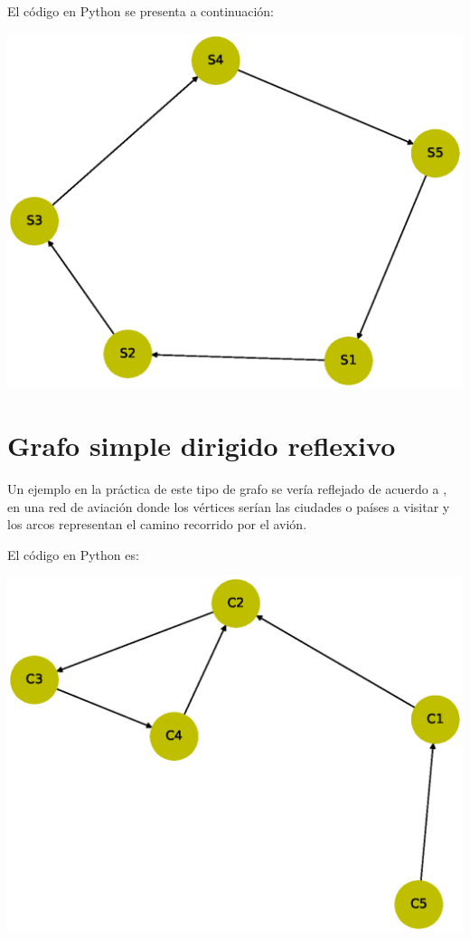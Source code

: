 \documentclass[10pt,a4paper]{article}
\begin{document}
El código en Python se presenta a continuación:



\begin{center}

\includegraphics[scale=0.4]{GDC}

\end{center}

\section{Grafo simple dirigido reflexivo}

Un ejemplo en la práctica de este tipo de grafo se vería reflejado de acuerdo a \cite{art2}, en una red de aviación donde los vértices serían las ciudades o países a visitar y los arcos representan el camino recorrido por el avión.\vspace{.4cm}

El código en Python es:



\begin{center}

\includegraphics[scale=0.4]{GDR}

\end{center}
\end{document}
